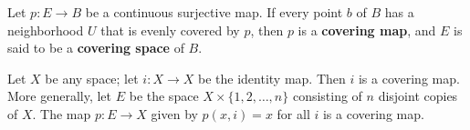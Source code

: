 \begin{definition}
Let $p\colon E \rightarrow B$ be a continuous surjective map. If every point $b$ of $B$ has a neighborhood $U$ that is evenly covered by $p$, then $p$ is a \textbf{covering map},
and $E$ is said to be a \textbf{covering space} of $B$.
\end{definition}

\begin{eg}
Let $X$ be any space; let $i\colon X \rightarrow X$ be the identity map. Then $i$ is a covering map. \\

More generally, let $E$ be the space $X \times \{ 1, 2, \dots, n \}$ consisting of $n$ disjoint copies of $X$. The map $p\colon E \rightarrow X$ given by $p(x, i) = x$ 
for all $i$ is a covering map.
\end{eg}

